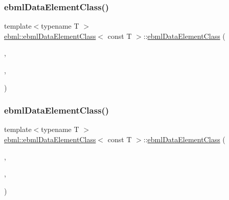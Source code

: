 \mbox{\label{classebml_1_1ebmlDataElementClass_3_01const_01T_01_4_afabeada87b7b2a7fd9a5944b8534cb5d}} 
\subsubsection{\texorpdfstring{ebml\+Data\+Element\+Class()}{ebmlDataElementClass()}\hspace{0.1cm}{\footnotesize\ttfamily [5/6]}}
{\footnotesize\ttfamily template$<$typename T $>$ \\
\mbox{\hyperlink{classebml_1_1ebmlDataElementClass}{ebml\+::ebml\+Data\+Element\+Class}}$<$ const T $>$\+::\mbox{\hyperlink{classebml_1_1ebmlDataElementClass}{ebml\+Data\+Element\+Class}} (\begin{DoxyParamCaption}\item[{\mbox{\hyperlink{namespaceebml_a86c5f604ddf12a74aa9812e997a58691}{ebml\+I\+D\+\_\+t}}}]{,  }\item[{const std\+::wstring \&}]{,  }\item[{const T \&}]{ }\end{DoxyParamCaption})}

\mbox{\label{classebml_1_1ebmlDataElementClass_3_01const_01T_01_4_a2b30da4fc5e2e00ee773db25db952704}} 
\subsubsection{\texorpdfstring{ebml\+Data\+Element\+Class()}{ebmlDataElementClass()}\hspace{0.1cm}{\footnotesize\ttfamily [6/6]}}
{\footnotesize\ttfamily template$<$typename T $>$ \\
\mbox{\hyperlink{classebml_1_1ebmlDataElementClass}{ebml\+::ebml\+Data\+Element\+Class}}$<$ const T $>$\+::\mbox{\hyperlink{classebml_1_1ebmlDataElementClass}{ebml\+Data\+Element\+Class}} (\begin{DoxyParamCaption}\item[{\mbox{\hyperlink{namespaceebml_a86c5f604ddf12a74aa9812e997a58691}{ebml\+I\+D\+\_\+t}}}]{,  }\item[{const std\+::wstring \&}]{,  }\item[{T \&\&}]{ }\end{DoxyParamCaption})}




